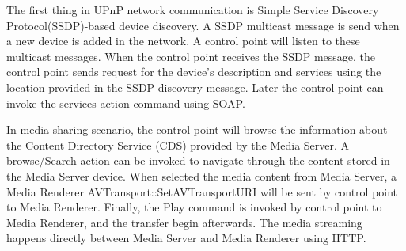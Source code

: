 The first thing in UPnP network communication is Simple Service Discovery Protocol(SSDP)-based device discovery. A SSDP multicast message is send when a new device is added in the network. A control point will listen to these multicast messages. When the control point receives the SSDP message, the control point sends request for the device's description and services using the location provided in the SSDP discovery message. Later the control point can invoke the services action command using SOAP.

In media sharing scenario, the control point will browse the information about the Content Directory Service (CDS) provided by the Media Server. A browse/Search action can be invoked to navigate through the content stored in the Media Server device. When selected the media content from Media Server, a Media Renderer AVTransport::SetAVTransportURI will be sent by control point to Media Renderer. Finally, the Play command is invoked by control point to Media Renderer, and the transfer begin afterwards. The media streaming happens directly between Media Server and Media Renderer using HTTP.
